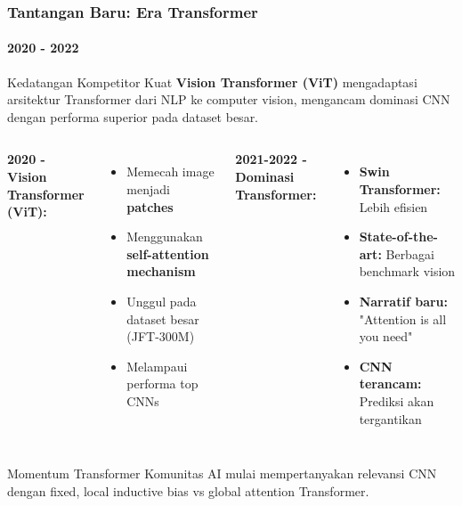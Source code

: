 \documentclass[t,aspectratio=169,xcolor=dvipsnames]{beamer}
\begin{document}
\begin{frame}
    \frametitle{Tantangan Baru: Era Transformer}
    \framesubtitle{2020 - 2022}
    \footnotesize

    \begin{alertblock}{Kedatangan Kompetitor Kuat}
        \textbf{Vision Transformer (ViT)} mengadaptasi arsitektur Transformer dari NLP ke computer vision, mengancam dominasi CNN dengan performa superior pada dataset besar.
    \end{alertblock}

    \begin{columns}[t]
        \textbf{2020 - Vision Transformer (ViT):}
        \begin{itemize}
            \item Memecah image menjadi \textbf{patches}
            \item Menggunakan \textbf{self-attention mechanism}
            \item Unggul pada dataset besar (JFT-300M)
            \item Melampaui performa top CNNs
        \end{itemize}

        \textbf{2021-2022 - Dominasi Transformer:}
        \begin{itemize}
            \item \textbf{Swin Transformer:} Lebih efisien
            \item \textbf{State-of-the-art:} Berbagai benchmark vision
            \item \textbf{Narratif baru:} "Attention is all you need"
            \item \textbf{CNN terancam:} Prediksi akan tergantikan
        \end{itemize}
    \end{columns}

    \begin{block}{Momentum Transformer}
        Komunitas AI mulai mempertanyakan relevansi CNN dengan fixed, local inductive bias vs global attention Transformer.
    \end{block}
\end{frame}
\end{document}
